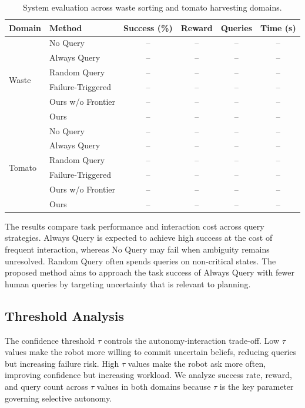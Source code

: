 \begin{table}[t]
\centering
\caption{System evaluation across waste sorting and tomato harvesting domains.}
\label{tab:system_eval}
\begin{tabular}{llcccc}
\toprule
Domain & Method & Success (\%) & Reward & Queries & Time (s) \\
\midrule
\multirow{6}{*}{Waste}
& No Query & -- & -- & -- & -- \\
& Always Query & -- & -- & -- & -- \\
& Random Query & -- & -- & -- & -- \\
& Failure-Triggered & -- & -- & -- & -- \\
& Ours w/o Frontier & -- & -- & -- & -- \\
& Ours & -- & -- & -- & -- \\
\midrule
\multirow{6}{*}{Tomato}
& No Query & -- & -- & -- & -- \\
& Always Query & -- & -- & -- & -- \\
& Random Query & -- & -- & -- & -- \\
& Failure-Triggered & -- & -- & -- & -- \\
& Ours w/o Frontier & -- & -- & -- & -- \\
& Ours & -- & -- & -- & -- \\
\bottomrule
\end{tabular}
\end{table}

The results compare task performance and interaction cost across query strategies. Always Query is expected to achieve high success at the cost of frequent interaction, whereas No Query may fail when ambiguity remains unresolved. Random Query often spends queries on non-critical states. The proposed method aims to approach the task success of Always Query with fewer human queries by targeting uncertainty that is relevant to planning.

\subsection{Threshold Analysis}


The confidence threshold $\tau$ controls the autonomy-interaction trade-off. Low $\tau$ values make the robot more willing to commit uncertain beliefs, reducing queries but increasing failure risk. High $\tau$ values make the robot ask more often, improving confidence but increasing workload. We analyze success rate, reward, and query count across $\tau$ values in both domains because $\tau$ is the key parameter governing selective autonomy.

